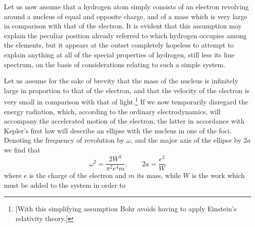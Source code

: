 Let us now assume that a hydrogen atom simply consists of an electron
revolving around a nucleus of equal and opposite charge, and of a mass
which is very large in comparison with that of the electron. It is
evident that this assumption may explain the peculiar position already
referred to which hydrogen occupies among the elements, but it appears
at the outset completely hopeless to attempt to explain anything at all
of the special properties of hydrogen, still less its line spectrum, on
the basis of considerations relating to such a simple system.

Let us assume for the sake of brevity that the mass of the nucleus is
infinitely large in proportion to that of the electron, and that the
velocity of the electron is very small in comparison with that of
light.\footnote{{[}With this simplifying assumption Bohr avoids having
  to apply Einstein's relativity theory.{]}} If we now temporarily
disregard the energy radiation, which, according to the ordinary
electrodynamics, will accompany the accelerated motion of the electron,
the latter in accordance with Kepler's first law will describe an
ellipse with the nucleus in one of the foci. Denoting the frequency of
revolution by $\omega$, and the major axis of the ellipse by 2$a$
we find that
%
\begin{equation}\label{eq:bohr_4}
\omega^2 = \frac{2W^3}{\pi^2e^4m} ,\quad\quad 2a = \frac{e^2}{W}
\end{equation}
%
where $e$ is the charge of the electron and $m$ its mass,
while $W$ is the work which must be added to the system in order to
